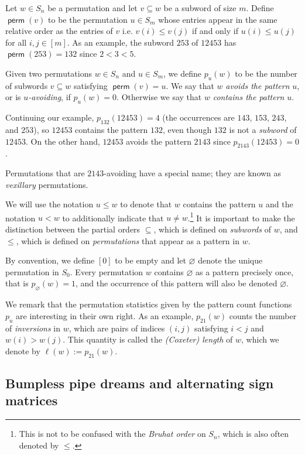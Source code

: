 \documentclass[11pt]{article}
\theoremstyle{definition}
\numberwithin{equation}{section}
\newcommand{\sseq}{\subseteq}
\DeclareMathOperator{\perm}{\mathsf{perm}}
\begin{document}
Let $w\in S_n$ be a permutation and let 
$v\sseq w$ be a subword of size $m$.
Define $\perm(v)$ to be the permutation $u\in S_m$ whose entries appear in the same relative order as the entries of $v$ i.e. $v(i) \leq v(j)$ if and only if $u(i) \leq u(j)$ for all $i,j\in [m]$.
As an example, the subword $253$ of $12453$ has $\perm(253) = 132$ since $2<3<5$.

Given two permutations $w\in S_n$ and $u\in S_m$,
we define $p_u(w)$ to be the number of subwords $v\sseq w$ satisfying $\perm(v) = u$.
We say that $w$ \textit{avoids the pattern} $u$, or is \textit{$u$-avoiding}, if $p_u(w) = 0$.
Otherwise we say that $w$ \textit{contains the pattern} $u$.

Continuing our example, $p_{132}(12453) = 4$ (the occurrences are $143$, $153$, $243$, and $253$), so $12453$ contains the pattern $132$, even though $132$ is not a \textit{subword} of $12453$.
On the other hand, $12453$ avoids the pattern $2143$ since $p_{2143}(12453) = 0$.

Permutations that are $2143$-avoiding have a special name; they are known as \textit{vexillary} permutations.

We will use the notation $u\leq w$ to denote that $w$ contains the pattern $u$ and the notation $u< w$ to additionally indicate that $u\neq w$.\footnote{
    This is not to be confused with the \textit{Bruhat order} on $S_n$, which is also often denoted by $\leq$.
}
It is important to make the distinction between the partial orders $\sseq$, which is defined on \textit{subwords} of $w$, and $\leq$, which is defined on \textit{permutations} that appear as a pattern in $w$.

By convention, we define $[0]$ to be empty and let $\varnothing$ denote the unique permutation in $S_0$.
Every permutation $w$ contains $\varnothing$ as a pattern precisely once, that is $p_\varnothing(w) = 1$, and the occurrence of this pattern will also be denoted $\varnothing$.

We remark that the permutation statistics given by the pattern count functions $p_u$ are interesting in their own right.
As an example, $p_{21}(w)$ counts the number of \textit{inversions} in $w$, which are pairs of indices $(i,j)$ satisfying $i<j$ and $w(i)>w(j)$.
This quantity is called the \textit{\textup{(}Coxeter\textup{)} length} of $w$, which we denote by $\ell(w) := p_{21}(w)$.



\subsection{Bumpless pipe dreams and alternating sign matrices}
\label{sect:bpd}
\end{document}
